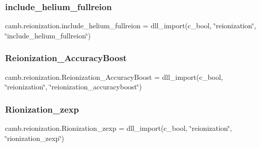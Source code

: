 \subsubsection{\texorpdfstring{include\+\_\+helium\+\_\+fullreion}{include\_helium\_fullreion}}
{\footnotesize\ttfamily camb.\+reionization.\+include\+\_\+helium\+\_\+fullreion = dll\+\_\+import(c\+\_\+bool, \char`\"{}reionization\char`\"{}, \char`\"{}include\+\_\+helium\+\_\+fullreion\char`\"{})}

\mbox{\label{namespacecamb_1_1reionization_a03b2a922c673270d5a36d7e882852097}} 
\subsubsection{\texorpdfstring{Reionization\+\_\+\+Accuracy\+Boost}{Reionization\_AccuracyBoost}}
{\footnotesize\ttfamily camb.\+reionization.\+Reionization\+\_\+\+Accuracy\+Boost = dll\+\_\+import(c\+\_\+bool, \char`\"{}reionization\char`\"{}, \char`\"{}reionization\+\_\+accuracyboost\char`\"{})}

\mbox{\label{namespacecamb_1_1reionization_a57802327e3a3b292799b0e985c31f805}} 
\subsubsection{\texorpdfstring{Rionization\+\_\+zexp}{Rionization\_zexp}}
{\footnotesize\ttfamily camb.\+reionization.\+Rionization\+\_\+zexp = dll\+\_\+import(c\+\_\+bool, \char`\"{}reionization\char`\"{}, \char`\"{}rionization\+\_\+zexp\char`\"{})}

